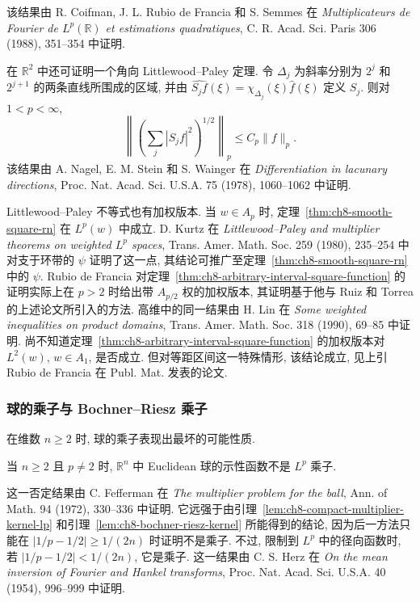 该结果由 R. Coifman, J. L. Rubio de Francia 和 S. Semmes 在 \textit{Multiplicateurs de Fourier de $L^p(\mathbb R)$ et estimations quadratiques}, C. R. Acad. Sci. Paris 306 (1988), 351--354 中证明.

在 $\mathbb R^2$ 中还可证明一个角向 Littlewood--Paley 定理. 令 $\Delta_j$ 为斜率分别为 $2^j$ 和 $2^{j+1}$ 的两条直线所围成的区域, 并由 $\widehat{S_jf}(\xi)=\chi_{\Delta_j}(\xi)\widehat f(\xi)$ 定义 $S_j$. 则对 $1<p<\infty$,
\[
 \left\|\left(\sum_j|S_jf|^2\right)^{1/2}\right\|_p
 \le C_p\|f\|_p.
\]
该结果由 A. Nagel, E. M. Stein 和 S. Wainger 在 \textit{Differentiation in lacunary directions}, Proc. Nat. Acad. Sci. U.S.A. 75 (1978), 1060--1062 中证明.

Littlewood--Paley 不等式也有加权版本. 当 $w\in A_p$ 时, 定理~\ref{thm:ch8-smooth-square-rn} 在 $L^p(w)$ 中成立. D. Kurtz 在 \textit{Littlewood--Paley and multiplier theorems on weighted $L^p$ spaces}, Trans. Amer. Math. Soc. 259 (1980), 235--254 中对支于环带的 $\psi$ 证明了这一点, 其结论可推广至定理~\ref{thm:ch8-smooth-square-rn} 中的 $\psi$. Rubio de Francia 对定理~\ref{thm:ch8-arbitrary-interval-square-function} 的证明实际上在 $p>2$ 时给出带 $A_{p/2}$ 权的加权版本, 其证明基于他与 Ruiz 和 Torrea 的上述论文所引入的方法. 高维中的同一结果由 H. Lin 在 \textit{Some weighted inequalities on product domains}, Trans. Amer. Math. Soc. 318 (1990), 69--85 中证明. 尚不知道定理~\ref{thm:ch8-arbitrary-interval-square-function} 的加权版本对 $L^2(w)$, $w\in A_1$, 是否成立. 但对等距区间这一特殊情形, 该结论成立, 见上引 Rubio de Francia 在 Publ. Mat. 发表的论文.

\hypertarget{chapter-08-page-199}{}
\subsubsection{球的乘子与 Bochner--Riesz 乘子}
\label{subsec:ch8-ball-bochner-riesz}

在维数 $n\ge2$ 时, 球的乘子表现出最坏的可能性质.

\begin{Theorem}
\label{thm:ch8-ball-multiplier-negative}
当 $n\ge2$ 且 $p\ne2$ 时, $\mathbb R^n$ 中 Euclidean 球的示性函数不是 $L^p$ 乘子.
\end{Theorem}

这一否定结果由 C. Fefferman 在 \textit{The multiplier problem for the ball}, Ann. of Math. 94 (1972), 330--336 中证明. 它远强于由引理~\ref{lem:ch8-compact-multiplier-kernel-lp} 和引理~\ref{lem:ch8-bochner-riesz-kernel} 所能得到的结论, 因为后一方法只能在 $|1/p-1/2|\ge1/(2n)$ 时证明不是乘子. 不过, 限制到 $L^p$ 中的径向函数时, 若 $|1/p-1/2|<1/(2n)$, 它是乘子. 这一结果由 C. S. Herz 在 \textit{On the mean inversion of Fourier and Hankel transforms}, Proc. Nat. Acad. Sci. U.S.A. 40 (1954), 996--999 中证明.

